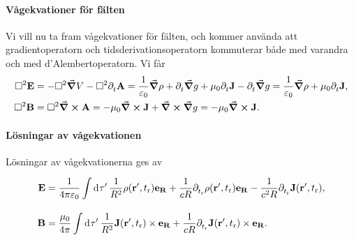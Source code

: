 \paragraph{Vågekvationer för fälten}
Vi vill nu ta fram vågekvationer för fälten, och kommer använda att gradientoperatorn och tidsderivationsoperatorn kommuterar både med varandra och med d'Alembertoperatorn. Vi får
\begin{align*}
	\Box^{2}{\vb{E}} &= -\Box^{2}{\grad{V}} - \Box^{2}{\partial_{t}^{}\vb{A}} = \frac{1}{\varepsilon_{0}}\grad{\rho} + \partial_{t}^{}\grad{g} + \mu_{0}\partial_{t}^{}\vb{J} - \partial_{t}^{}\grad{g} = \frac{1}{\varepsilon_{0}}\grad{\rho} + \mu_{0}\partial_{t}^{}\vb{J}, \\
	\Box^{2}{\vb{B}} &= \Box^{2}{\curl{\vb{A}}} = -\mu_{0}\curl{\vb{J}} + \curl{\grad{g}} = -\mu_{0}\curl{\vb{J}}.
\end{align*}

\paragraph{Lösningar av vågekvationen}
Lösningar av vågekvationerna ges av
\begin{align*}
	\vb{E} &= \frac{1}{4\pi\varepsilon_{0}}\int\limits_{}^{}\dd[]{\tau'}\frac{1}{R^{2}}\rho(\vb{r}', t_{\text{r}})\vb{e}_{\vb{R}} + \frac{1}{cR}\partial_{t_{\text{r}}}^{}\rho(\vb{r}', t_{\text{r}})\vb{e}_{\vb{R}} - \frac{1}{c^{2}R}\partial_{t_{\text{r}}}^{}\vb{J}(\vb{r}', t_{\text{r}}), \\
	\vb{B} &= \frac{\mu_{0}}{4\pi}\int\limits_{}^{}\dd[]{\tau'}\frac{1}{R^{2}}\vb{J}(\vb{r}', t_{\text{r}})\times\vb{e}_{\vb{R}} + \frac{1}{cR}\partial_{t_{\text{r}}}^{}\vb{J}(\vb{r}', t_{\text{r}})\times\vb{e}_{\vb{R}}.
\end{align*}

